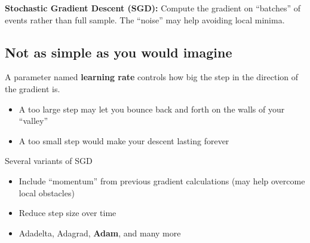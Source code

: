 \textbf{Stochastic Gradient Descent (SGD):}
Compute the gradient on “batches” of events rather than full sample. The “noise” may help avoiding local minima.

\subsection{Not as simple as you would imagine}

A parameter named \textbf{learning rate} controls how big the step in the direction of the gradient is.
\begin{itemize}
	\item A too large step may let you bounce back and forth on the walls of your “valley”
	\item A too small step would make your descent lasting forever
\end{itemize}
Several variants of SGD
\begin{itemize}
	\item Include “momentum” from previous gradient	calculations (may help overcome local obstacles) 
	\item Reduce step size over time
	\item Adadelta, Adagrad, \textbf{Adam}, and many more
\end{itemize}


